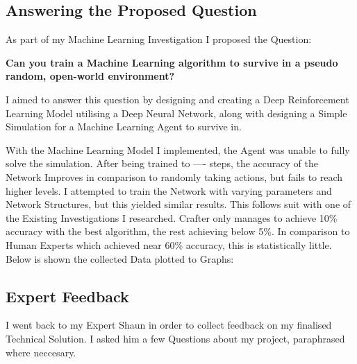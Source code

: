 \begin{flushleft}
            \vspace{0.5cm}   

        \vspace{0.5cm}
    \subsection{Answering the Proposed Question}
        \vspace{0.2cm}
        As part of my Machine Learning Investigation I proposed the Question:

        \vspace{0.3cm}\begin{center}
        \textbf{Can you train a Machine Learning algorithm to survive in a pseudo random, open-world environment?}
        \end{center}\vspace{0.3cm}

        I aimed to answer this question by designing and creating a Deep Reinforcement Learning Model utilising a Deep Neural Network, along 
        with designing a Simple Simulation for a Machine Learning Agent to survive in. \\
        \vspace{0.5cm}

        With the Machine Learning Model I implemented, the Agent was unable to fully solve the simulation. After being trained to ----
        steps, the accuracy of the Network Improves in comparison to randomly taking actions, but fails to reach higher levels. 
        I attempted to train the Network with varying parameters and Network Structures, but this yielded similar results. This follows 
        suit with one of the Existing Investigations I researched. Crafter only manages to achieve 10\% accuracy with the best algorithm, 
        the rest achieving below 5\%. In comparison to Human Experts which achieved near 60\% accuracy, this is statistically little. \\
        \vspace{0.5cm}
        Below is shown the collected Data plotted to Graphs: \\

    \subsection{Expert Feedback}
        \vspace{0.2cm}
        I went back to my Expert Shaun in order to collect feedback on my finalised Technical Solution. I asked him a few Questions about my
        project, paraphrased where neccesary. \\
        \vspace{0.5cm}


\end{flushleft}
